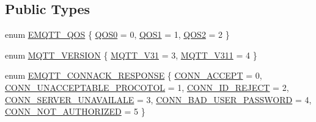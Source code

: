 \subsection*{Public Types}
\begin{DoxyCompactItemize}
\item 
enum \hyperlink{class_m_q_t_t_aff501e08e20ebf26b3272fcc0e7215ff}{E\+M\+Q\+T\+T\+\_\+\+Q\+OS} \{ \hyperlink{class_m_q_t_t_aff501e08e20ebf26b3272fcc0e7215ffa14dc14f3d6013dcbfb6a2d88f9245b81}{Q\+O\+S0} = 0, 
\hyperlink{class_m_q_t_t_aff501e08e20ebf26b3272fcc0e7215ffa67190ba35b18fa3bcdc3b1c34256b8f7}{Q\+O\+S1} = 1, 
\hyperlink{class_m_q_t_t_aff501e08e20ebf26b3272fcc0e7215ffa824da0ec0c31a8d2978980a4ac9f7eb2}{Q\+O\+S2} = 2
 \}
\item 
enum \hyperlink{class_m_q_t_t_a49430c9d6f68bbdc4e1bd039a6f5f97e}{M\+Q\+T\+T\+\_\+\+V\+E\+R\+S\+I\+ON} \{ \hyperlink{class_m_q_t_t_a49430c9d6f68bbdc4e1bd039a6f5f97eaf955bab848df0e287c12f20b3af37885}{M\+Q\+T\+T\+\_\+\+V31} = 3, 
\hyperlink{class_m_q_t_t_a49430c9d6f68bbdc4e1bd039a6f5f97eae61f66bbb0b315cf4cb7636684c68602}{M\+Q\+T\+T\+\_\+\+V311} = 4
 \}
\item 
enum \hyperlink{class_m_q_t_t_a83c67833cdf6dfead0d42e6b48dae8bc}{E\+M\+Q\+T\+T\+\_\+\+C\+O\+N\+N\+A\+C\+K\+\_\+\+R\+E\+S\+P\+O\+N\+SE} \{ \newline
\hyperlink{class_m_q_t_t_a83c67833cdf6dfead0d42e6b48dae8bca10b54b970868dd657f962f3e0211c51a}{C\+O\+N\+N\+\_\+\+A\+C\+C\+E\+PT} = 0, 
\hyperlink{class_m_q_t_t_a83c67833cdf6dfead0d42e6b48dae8bcab926be43cd794bcff8effaca0e3df5a2}{C\+O\+N\+N\+\_\+\+U\+N\+A\+C\+C\+E\+P\+T\+A\+B\+L\+E\+\_\+\+P\+R\+O\+C\+O\+T\+OL} = 1, 
\hyperlink{class_m_q_t_t_a83c67833cdf6dfead0d42e6b48dae8bcadfea79ffb19345af8eec727a2fab5ba7}{C\+O\+N\+N\+\_\+\+I\+D\+\_\+\+R\+E\+J\+E\+CT} = 2, 
\hyperlink{class_m_q_t_t_a83c67833cdf6dfead0d42e6b48dae8bca3f3bbddc59683ce074489bdba3479314}{C\+O\+N\+N\+\_\+\+S\+E\+R\+V\+E\+R\+\_\+\+U\+N\+A\+V\+A\+I\+L\+A\+LE} = 3, 
\newline
\hyperlink{class_m_q_t_t_a83c67833cdf6dfead0d42e6b48dae8bcaa51f8337e0cd58337a6d9de028f7ffc5}{C\+O\+N\+N\+\_\+\+B\+A\+D\+\_\+\+U\+S\+E\+R\+\_\+\+P\+A\+S\+S\+W\+O\+RD} = 4, 
\hyperlink{class_m_q_t_t_a83c67833cdf6dfead0d42e6b48dae8bca2a9953af7d955ad4954e9836a03ee4fa}{C\+O\+N\+N\+\_\+\+N\+O\+T\+\_\+\+A\+U\+T\+H\+O\+R\+I\+Z\+ED} = 5
 \}
\end{DoxyCompactItemize}
